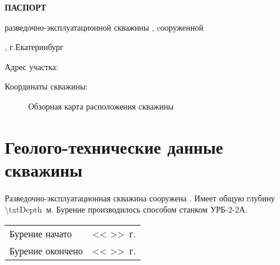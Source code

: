 
	\begin{center}
		\textbf{ПАСПОРТ}

		разведочно-эксплуатационной скважины \txtNumber, cооруженной 

		\txtExecutor, г.Екатеринбург

	\end{center}


	\bigskip
	
	Адрес участка: 

	\underline{\txtAddress}

	\bigskip


	Координаты скважины: \txtCoords
	

	\begin{figure}[h]
		\centering
		\caption{Обзорная карта расположения скважины}
	\end{figure}

    \section{Геолого-технические данные скважины}

    Разведочно-эксплуатационная скважина сооружена \txtExecutor. Имеет общую глубину \num{\txtDepth} \,м.   Бурение производилось \txtBoringMode способом станком УРБ-2-2А.

    \bigskip


	\begin{tabular}{@{}ll}
	Бурение начато & << \underline{\hspace{0.7cm}} >> \underline{\hspace{3cm}} \txtYear \,г.\\
	Бурение окончено & << \underline{\hspace{0.7cm}} >> \underline{\hspace{3cm}} \txtYear \,г.\\
	\end{tabular}
	
